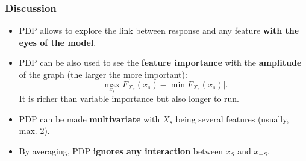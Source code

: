 \begin{frame}
\frametitle{Discussion}
\begin{itemize}
\item PDP allows to explore the link between response and any feature {\bf with the eyes of the model}.
\item PDP can be also used to see the {\bf feature importance} with the {\bf amplitude} of the graph (the larger the more important):
$$
\vert \max_{x_s} F_{X_s}(x_s) - \min F_{X_s}(x_s) \vert.
$$
It is richer than variable importance but also longer to run.
\item PDP can be made {\bf multivariate} with $X_s$ being several features (usually, max. 2).
\item By averaging, PDP {\bf ignores any interaction} between $x_S$ and $x_{-S}$.
\end{itemize}
\end{frame}

